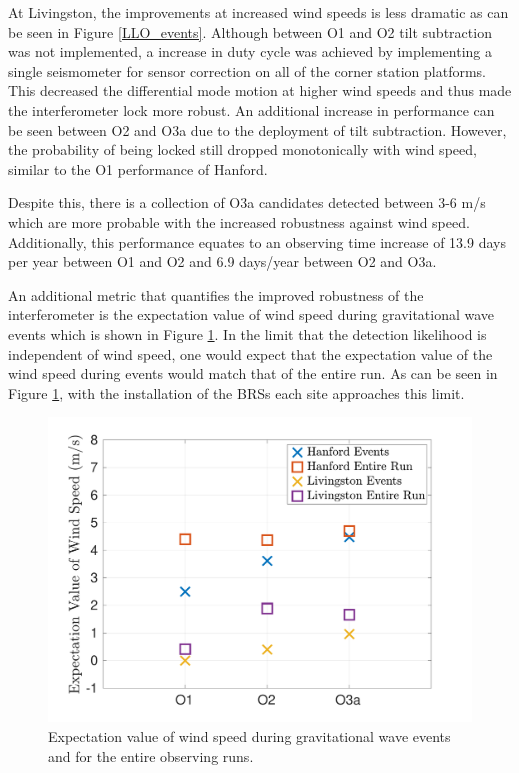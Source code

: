 \documentclass [12pt, proquest]{uwthesis}[2019]
\begin{document}
At Livingston, the improvements at increased wind speeds is less dramatic as can be seen in Figure \ref{LLO_events}. Although between O1 and O2 tilt subtraction was not implemented, a increase in duty cycle was achieved by implementing a single seismometer for sensor correction on all of the corner station platforms. This decreased the differential mode motion at higher wind speeds and thus made the interferometer lock more robust. An additional increase in performance can be seen between O2 and O3a due to the deployment of tilt subtraction. However, the probability of being locked still dropped monotonically with wind speed, similar to the O1 performance of Hanford.

Despite this, there is a collection of O3a candidates detected between 3-6 m/s which are more probable with the increased robustness against wind speed. Additionally, this performance equates to an observing time increase of 13.9 days per year between O1 and O2 and 6.9 days/year between O2 and O3a.

An additional metric that quantifies the improved robustness of the interferometer is the expectation value of wind speed during gravitational wave events which is shown in Figure \ref{WindExp}. In the limit that the detection likelihood is independent of wind speed, one would expect that the expectation value of the wind speed during events would match that of the entire run. As can be seen in Figure \ref{WindExp}, with the installation of the BRSs each site approaches this limit. 

\begin{figure}[!h]
\begin{center}
\includegraphics[width=\textwidth]{WindExpect.pdf}
\caption[Expectation value of wind speed during GW events]{Expectation value of wind speed during gravitational wave events and for the entire observing runs.}
\label{WindExp}
\end{center}
\end{figure}
\end{document}
